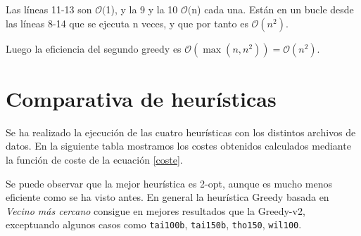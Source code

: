 \documentclass[a4paper, 11pt]{article} %
\newcommand{\ef}[1]{$\mathcal{O}#1$}
\begin{document}
Las líneas 11-13 son \ef(1), y la 9 y la 10 \ef(n) cada una. Están en un bucle desde
las líneas 8-14 que se ejecuta n veces, y que por tanto es $\mathcal{O}(n^2)$.

Luego la eficiencia del segundo greedy es $\mathcal{O}(\max(n,n^2))=\mathcal{O}(n^2)$.

\section{Comparativa de heurísticas}
Se ha realizado la ejecución de las cuatro heurísticas con los distintos archivos de datos. En la siguiente tabla mostramos los costes obtenidos calculados mediante la función de coste de la ecuación \ref{coste}.

Se puede observar que la mejor heurística es 2-opt, aunque es mucho menos eficiente como se ha visto antes. En general la heurística Greedy basada en \textit{Vecino más cercano} consigue en mejores resultados que la Greedy-v2, exceptuando algunos casos como \texttt{tai100b}, \texttt{tai150b}, \texttt{tho150}, \texttt{wil100}.
\small

\normalsize
\end{document}

